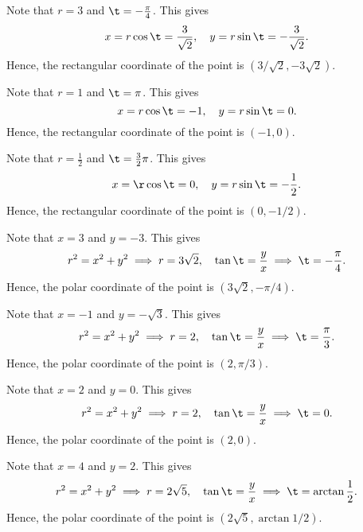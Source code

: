 \begin{solution}
    \begin{ppart}
        \begin{psubpart}
            Note that $r = 3$ and $\t = -\frac\pi4$. This gives \[x = r\cos\t = \frac{3}{\sqrt2}, \quad y = r\sin\t = -\frac{3}{\sqrt2}.\] Hence, the rectangular coordinate of the point is $(3/\sqrt2, -3\sqrt2)$.
        \end{psubpart}
        \begin{psubpart}
            Note that $r = 1$ and $\t = \pi$. This gives \[x = r\cos\t = -1, \quad y = r\sin\t = 0.\] Hence, the rectangular coordinate of the point is $(-1, 0)$.
        \end{psubpart}
        \begin{psubpart}
            Note that $r =\frac12$ and $\t = \frac32 \pi$. This gives \[x = \r\cos\t = 0, \quad y = r\sin\t = -\frac12.\] Hence, the rectangular coordinate of the point is $(0, -1/2)$.
        \end{psubpart}
    \end{ppart}
    \begin{ppart}
        \begin{psubpart}
            Note that $x = 3$ and $y = -3$. This gives \[r^2 = x^2 + y^2 \implies r = 3\sqrt2, \quad \tan \t = \frac{y}{x} \implies \t = -\frac\pi4.\] Hence, the polar coordinate of the point is $(3\sqrt2, -\pi/4)$.
        \end{psubpart}
        \begin{psubpart}
            Note that $x = -1$ and $y = -\sqrt3$. This gives \[r^2 = x^2 + y^2 \implies r = 2, \quad \tan \t = \frac{y}{x} \implies \t = \frac\pi3.\] Hence, the polar coordinate of the point is $(2, \pi/3)$.
        \end{psubpart}
        \begin{psubpart}
            Note that $x = 2$ and $y = 0$. This gives \[r^2 = x^2 + y^2 \implies r = 2, \quad \tan \t = \frac{y}{x} \implies \t = 0.\] Hence, the polar coordinate of the point is $(2, 0)$.
        \end{psubpart}
        \begin{psubpart}
            Note that $x = 4$ and $y = 2$. This gives \[r^2 = x^2 + y^2 \implies r = 2\sqrt5, \quad \tan \t = \frac{y}{x} \implies \t = \arctan \frac12.\] Hence, the polar coordinate of the point is $(2\sqrt5, \arctan{1/2})$.
        \end{psubpart}
    \end{ppart}
\end{solution}

